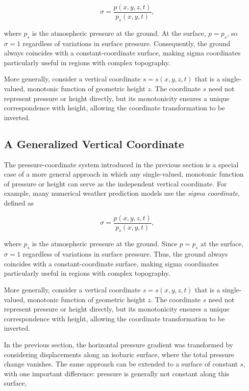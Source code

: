 \documentclass[10pt,twocolumn]{memoir}
\begin{document}
\begin{equation}
    \sigma=\frac{p(x,y,z,t)}{p_s(x,y,t)},
\end{equation}

where $p_s$ is the atmospheric pressure at the ground. At the surface, $p=p_s$, so $\sigma=1$ regardless of variations in surface pressure. Consequently, the ground always coincides with a constant-coordinate surface, making sigma coordinates particularly useful in regions with complex topography.

More generally, consider a vertical coordinate $s=s(x,y,z,t)$ that is a single-valued, monotonic function of geometric height $z$. The coordinate $s$ need not represent pressure or height directly, but its monotonicity ensures a unique correspondence with height, allowing the coordinate transformation to be inverted.

\subsection{A Generalized Vertical Coordinate}

The pressure-coordinate system introduced in the previous section is a special case of a more general approach in which any single-valued, monotonic function of pressure or height can serve as the independent vertical coordinate. For example, many numerical weather prediction models use the \textit{sigma coordinate}, defined as

\begin{equation}
    \sigma=\frac{p(x,y,z,t)}{p_s(x,y,t)},
\end{equation}

where $p_s$ is the atmospheric pressure at the ground. Since $p=p_s$ at the surface, $\sigma=1$ regardless of variations in surface pressure. Thus, the ground always coincides with a constant-coordinate surface, making sigma coordinates particularly useful in regions with complex topography.

More generally, consider a vertical coordinate $s=s(x,y,z,t)$ that is a single-valued, monotonic function of geometric height $z$. The coordinate $s$ need not represent pressure or height directly, but its monotonicity ensures a unique correspondence with height, allowing the coordinate transformation to be inverted.

In the previous section, the horizontal pressure gradient was transformed by considering displacements along an isobaric surface, where the total pressure change vanishes. The same approach can be extended to a surface of constant $s$, with one important difference: pressure is generally not constant along this surface,
\end{document}
